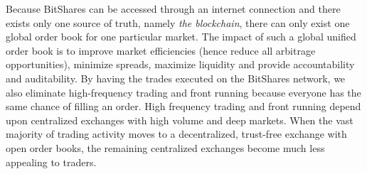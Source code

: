Because BitShares can be accessed through an internet connection and there
exists only one source of truth, namely \emph{the blockchain}, there can only
exist one global order book for one particular market. The impact of such a
global unified order book is to improve market efficiencies (hence reduce all
arbitrage opportunities), minimize spreads, maximize liquidity and provide
accountability and auditability. By having the trades executed on the BitShares
network, we also eliminate high-frequency trading and front running because
everyone has the same chance of filling an order. High frequency trading and
front running depend upon centralized exchanges with high volume and deep
markets. When the vast majority of trading activity moves to a decentralized,
trust-free exchange with open order books, the remaining centralized exchanges
become much less appealing to traders.

